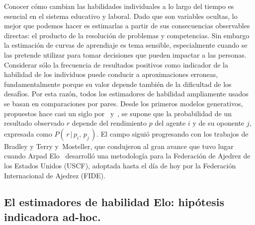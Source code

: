 \documentclass[a4paper,11pt]{book}
\theoremstyle{definition}
\begin{document}
Conocer cómo cambian las habilidades individuales a lo largo del tiempo es esencial en el sistema educativo y laboral.
%
Dado que son variables ocultas, lo mejor que podemos hacer es estimarlas a partir de sus consecuencias observables directas: el producto de la resolución de problemas y competencias.
%
Sin embargo la estimación de curvas de aprendiaje es tema sensible, especialmente cuando se las pretende utilizar para tomar decisiones que pueden impactar a las personas.
%
Considerar sólo la frecuencia de resultados positivos como indicador de la habilidad de los individuos puede conducir a aproximaciones erroneas, fundamentalmente porque su valor depende también de la dificultad de los desafíos.
%
Por esta razón, todos los estimadores de habilidad ampliamente usados se basan en comparaciones por pares.
%
Desde los primeros modelos generativos, propuestos hace casi un siglo por~\cite{Thurstone1927} y~\cite{Zermelo1929}, se supone que la probabilidad de un resultado observado $r$ depende del rendimiento $p$ del agente $i$ y de su oponente $j$, expresada como $P(\, r \,|\, p_i, \, p_j \,)$.
%
El campo siguió progresando con los trabajos de Bradley y Terry \cite{Bradley1952} y~\cite{Mosteller1951a,Mosteller1951b,Mosteller1951c}Mosteller, que condujeron al gran avance que tuvo lugar cuando Arpad Elo~\cite{Elo2008} desarrolló una metodología para la Federación de Ajedrez de los Estados Unidos (USCF), adoptada hasta el día de hoy por la Federación Internacional de Ajedrez (FIDE).

\subsection{El estimadores de habilidad Elo: hipótesis indicadora ad-hoc.}
\end{document}
